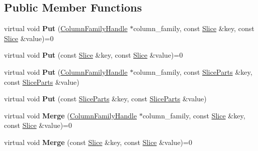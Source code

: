 \subsection*{Public Member Functions}
\begin{DoxyCompactItemize}
\item 
virtual void {\bfseries Put} (\hyperlink{classrocksdb_1_1ColumnFamilyHandle}{Column\+Family\+Handle} $\ast$column\+\_\+family, const \hyperlink{classrocksdb_1_1Slice}{Slice} \&key, const \hyperlink{classrocksdb_1_1Slice}{Slice} \&value)=0\hypertarget{classrocksdb_1_1WriteBatchBase_aea817d171f056e6ee144378164663369}{}\label{classrocksdb_1_1WriteBatchBase_aea817d171f056e6ee144378164663369}

\item 
virtual void {\bfseries Put} (const \hyperlink{classrocksdb_1_1Slice}{Slice} \&key, const \hyperlink{classrocksdb_1_1Slice}{Slice} \&value)=0\hypertarget{classrocksdb_1_1WriteBatchBase_aeecd539049885b5d8dbe73a7b6cd1162}{}\label{classrocksdb_1_1WriteBatchBase_aeecd539049885b5d8dbe73a7b6cd1162}

\item 
virtual void {\bfseries Put} (\hyperlink{classrocksdb_1_1ColumnFamilyHandle}{Column\+Family\+Handle} $\ast$column\+\_\+family, const \hyperlink{structrocksdb_1_1SliceParts}{Slice\+Parts} \&key, const \hyperlink{structrocksdb_1_1SliceParts}{Slice\+Parts} \&value)\hypertarget{classrocksdb_1_1WriteBatchBase_a02b791399f87d830385e8dac1ff60207}{}\label{classrocksdb_1_1WriteBatchBase_a02b791399f87d830385e8dac1ff60207}

\item 
virtual void {\bfseries Put} (const \hyperlink{structrocksdb_1_1SliceParts}{Slice\+Parts} \&key, const \hyperlink{structrocksdb_1_1SliceParts}{Slice\+Parts} \&value)\hypertarget{classrocksdb_1_1WriteBatchBase_a766888e105a00592db31afb650b3e2ee}{}\label{classrocksdb_1_1WriteBatchBase_a766888e105a00592db31afb650b3e2ee}

\item 
virtual void {\bfseries Merge} (\hyperlink{classrocksdb_1_1ColumnFamilyHandle}{Column\+Family\+Handle} $\ast$column\+\_\+family, const \hyperlink{classrocksdb_1_1Slice}{Slice} \&key, const \hyperlink{classrocksdb_1_1Slice}{Slice} \&value)=0\hypertarget{classrocksdb_1_1WriteBatchBase_aa32687074662f0543e1bac248bba1954}{}\label{classrocksdb_1_1WriteBatchBase_aa32687074662f0543e1bac248bba1954}

\item 
virtual void {\bfseries Merge} (const \hyperlink{classrocksdb_1_1Slice}{Slice} \&key, const \hyperlink{classrocksdb_1_1Slice}{Slice} \&value)=0\hypertarget{classrocksdb_1_1WriteBatchBase_aa839d22e7102816e41112190dc4191cf}{}\label{classrocksdb_1_1WriteBatchBase_aa839d22e7102816e41112190dc4191cf}


\end{DoxyCompactItemize}
